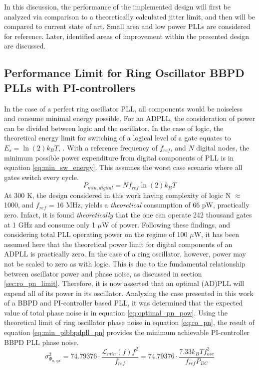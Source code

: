 In this discussion, the performance of the implemented design will first be analyzed via comparison to a theoretically calculated jitter limit, and then will be compared to current state of art. Small area and low power PLLs are considered for reference. Later, identified areas of improvement within the presented design are discussed.

\subsection{Performance Limit for Ring Oscillator BBPD PLLs with PI-controllers}\label{sec:fomjit_limit}
	In the case of a perfect ring oscillator PLL, all components would be noiseless and consume minimal energy possible. For an ADPLL, the consideration of power can be divided between logic and the oscillator. In the case of logic, the theoretical energy limit for switching of a logical level of a gate equates to $E_s = \ln(2) k_B T$, \cite{Lundstrom2006}. With a reference frequency of $f_{ref}$, and $N$ digital nodes, the minimum possible power expenditure from digital components of PLL is in equation \ref{eq:min_sw_energy}. This assumes the worst case scenario where all gates switch every cycle.
	\begin{equation}\label{eq:min_sw_energy}
		P_{min,digital} = Nf_{ref}\ln(2) k_B T
	\end{equation}
	At 300 K, the design considered in this work having complexity of logic N $\approx$ 1000, and $f_{ref}$ = 16 MHz, yields a \textit{theoretical} consumption of 66 pW, practically zero. Infact, it is found \textit{theoretically} that the one can operate 242 thousand gates at 1 GHz and consume only 1 $\mu$W of power. Following these findings, and considering total PLL operating power on the regime of 100 $\mu$W, it has been assumed here that the theoretical power limit for digital components of an ADPLL is practically zero. In the case of a ring oscillator, however, power may not be scaled to zero as with logic. This is due to the fundamental relationship between oscillator power and phase noise, as discussed in section \ref{sec:ro_pn_limit}. Therefore, it is now asserted that an optimal (AD)PLL will expend all of its power in its oscillator. Analyzing the case presented in this work of a BBPD and PI-controller based PLL, it was determined that the expected value of total phase noise is in equation \ref{eq:optimal_pn_pow}. Using the theoretical limit of ring oscillator phase noise in equation \ref{eq:ro_pn}, the result of equation \ref{eq:min_pibbpdpll_pn} provides the minimum achievable PI-controller BBPD PLL phase noise.
	\begin{equation}\label{eq:min_pibbpdpll_pn}
		\sigma_{\Phi_{n,opt}}^2 = 74.79376\cdot \frac{\mathcal{L}_{min}(f)f^2}{f_{ref}} = 74.79376\cdot  \frac{7.33 k_B T f_{osc}^2}{f_{ref}P_{DC}}
	\end{equation}

